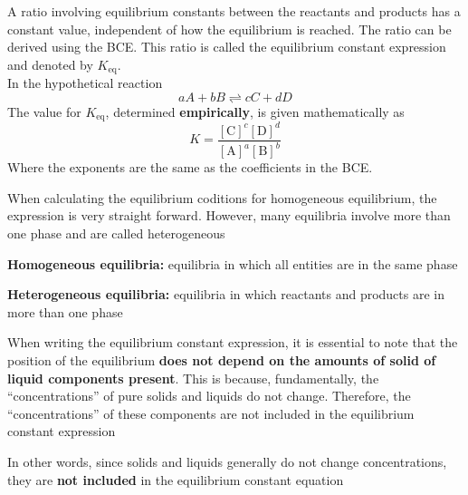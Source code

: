 A ratio involving equilibrium constants between the reactants and products has a constant value,
independent of how the equilibrium is reached. The ratio can be derived using the BCE. This ratio
is called the equilibrium constant expression and denoted by $K_\text{eq}$.\\

In the hypothetical reaction
\[
    aA+bB\rightleftharpoons cC+dD
\]
The value for $K_\text{eq}$, determined \textbf{empirically}, is given mathematically as
\[
    K=\frac{[\mathrm{C}]^c[\mathrm{D}]^d}{[\mathrm{A}]^a[\mathrm{B}]^b}
\]
Where the exponents are the same as the coefficients in the BCE.
\begin{bulleted-list}
    \item When calculating the equilibrium coditions for homogeneous equilibrium, the expression
        is very straight forward. However, many equilibria involve more than one phase and are
        called heterogeneous
    \item \textbf{Homogeneous equilibria:} equilibria in which all entities are in the same phase
    \item \textbf{Heterogeneous equilibria:} equilibria in which reactants and products are
        in more than one phase
    \item When writing the equilibrium constant expression, it is essential to note that the
        position of the equilibrium \textbf{does not depend on the amounts of solid of liquid
        components present}. This is because, fundamentally, the ``concentrations'' of pure solids
        and liquids do not change. Therefore, the ``concentrations'' of these components are not
        included in the equilibrium constant expression
    \item In other words, since solids and liquids generally do not change concentrations, they are
        \textbf{not included} in the equilibrium constant equation
\end{bulleted-list}

